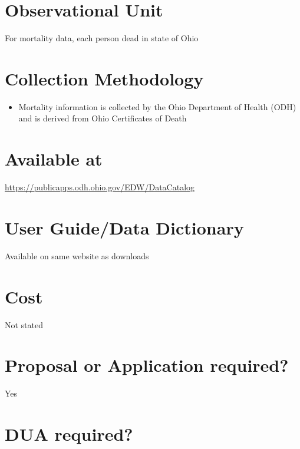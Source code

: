 \documentclass[
]{book}
\providecommand{\tightlist}{%
  \setlength{\itemsep}{0pt}\setlength{\parskip}{0pt}}
\begin{document}
\hypertarget{observational-unit-85}{%
\section{Observational Unit}\label{observational-unit-85}}

For mortality data, each person dead in state of Ohio

\hypertarget{collection-methodology-85}{%
\section{Collection Methodology}\label{collection-methodology-85}}

\begin{itemize}
\tightlist
\item
  Mortality information is collected by the Ohio Department of Health (ODH) and is derived from Ohio Certificates of Death
\end{itemize}

\hypertarget{available-at-85}{%
\section{Available at}\label{available-at-85}}

\url{https://publicapps.odh.ohio.gov/EDW/DataCatalog}

\hypertarget{user-guidedata-dictionary-85}{%
\section{User Guide/Data Dictionary}\label{user-guidedata-dictionary-85}}

Available on same website as downloads

\hypertarget{cost-85}{%
\section{Cost}\label{cost-85}}

Not stated

\hypertarget{proposal-or-application-required-85}{%
\section{Proposal or Application required?}\label{proposal-or-application-required-85}}

Yes

\hypertarget{dua-required-85}{%
\section{DUA required?}\label{dua-required-85}}
\end{document}
